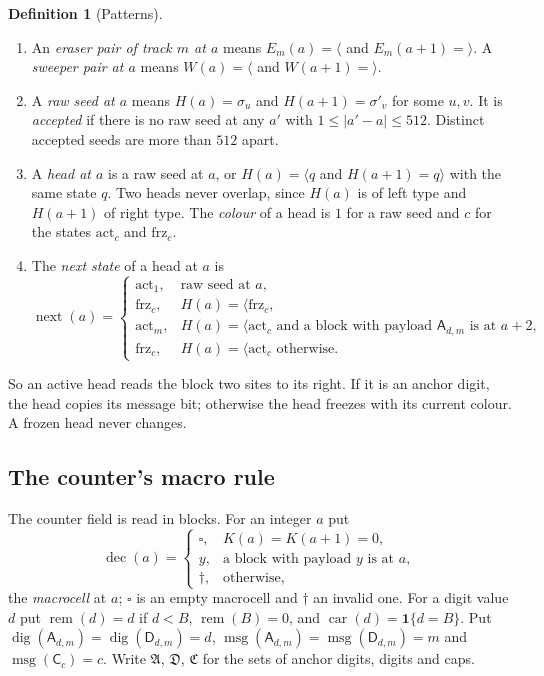 \documentclass[11pt]{article}
\theoremstyle{plain}
\theoremstyle{definition}
\newtheorem{definition}[theorem]{Definition}
\theoremstyle{remark}
\newcommand{\ind}{\mathbf 1}
\newcommand{\Lh}[1]{\langle #1}
\newcommand{\Rh}[1]{#1\rangle}
\newcommand{\mA}{\mathsf A}
\newcommand{\mD}{\mathsf D}
\newcommand{\mC}{\mathsf C}
\newcommand{\blank}{\square}
\newcommand{\inv}{\dagger}
\newcommand{\act}{\mathrm{act}}
\newcommand{\frz}{\mathrm{frz}}
\newcommand{\nxt}{\operatorname{next}}
\newcommand{\dec}{\operatorname{dec}}
\newcommand{\digit}{\operatorname{dig}}
\newcommand{\msg}{\operatorname{msg}}
\newcommand{\rem}{\operatorname{rem}}
\newcommand{\car}{\operatorname{car}}
\begin{document}
\begin{definition}[Patterns]\label{def:patterns}
\begin{enumerate}[label=(\alph*)]
\item An \emph{eraser pair of track $m$ at $a$} means $E_m(a)=\langle$ and $E_m(a+1)=\rangle$. A \emph{sweeper pair at $a$} means $W(a)=\langle$ and $W(a+1)=\rangle$.
\item A \emph{raw seed at $a$} means $H(a)=\sigma_u$ and $H(a+1)=\sigma'_v$ for some $u,v$. It is \emph{accepted} if there is no raw seed at any $a'$ with $1\le|a'-a|\le512$. Distinct accepted seeds are more than $512$ apart.
\item A \emph{head at $a$} is a raw seed at $a$, or $H(a)=\Lh q$ and $H(a+1)=\Rh q$ with the same state $q$. Two heads never overlap, since $H(a)$ is of left type and $H(a+1)$ of right type. The \emph{colour} of a head is $1$ for a raw seed and $c$ for the states $\act_c$ and $\frz_c$.
\item The \emph{next state} of a head at $a$ is
\[
\nxt(a)=\begin{cases}
\act_1,&\text{raw seed at }a,\\
\frz_c,&H(a)=\Lh{\frz_c},\\
\act_m,&H(a)=\Lh{\act_c}\text{ and a block with payload }\mA_{d,m}\text{ is at }a+2,\\
\frz_c,&H(a)=\Lh{\act_c}\text{ otherwise}.
\end{cases}
\]
\end{enumerate}
\end{definition}

So an active head reads the block two sites to its right. If it is an anchor digit, the head copies its message bit; otherwise the head freezes with its current colour. A frozen head never changes.

\subsection{The counter's macro rule}\label{subsec:macro}

The counter field is read in blocks. For an integer $a$ put
\[
\dec(a)=\begin{cases}\blank,&K(a)=K(a+1)=0,\\ y,&\text{a block with payload }y\text{ is at }a,\\ \inv,&\text{otherwise,}\end{cases}
\]
the \emph{macrocell} at $a$; $\blank$ is an empty macrocell and $\inv$ an invalid one. For a digit value $d$ put $\rem(d)=d$ if $d<B$, $\rem(B)=0$, and $\car(d)=\ind\{d=B\}$. Put $\digit(\mA_{d,m})=\digit(\mD_{d,m})=d$, $\msg(\mA_{d,m})=\msg(\mD_{d,m})=m$ and $\msg(\mC_c)=c$. Write $\mathfrak A$, $\mathfrak D$, $\mathfrak C$ for the sets of anchor digits, digits and caps.
\end{document}
